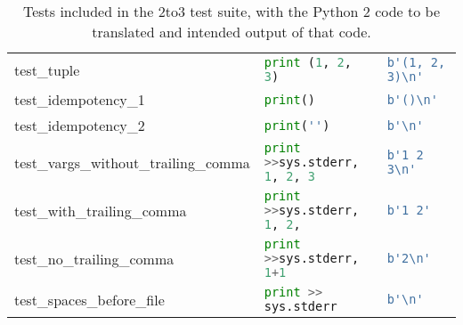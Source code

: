 \begin{table}[]
\begin{tabular}{@{}l|ll@{}}
    test\_tuple                           & \lstinline[language=Python, style=pythonstyle]|print (1, 2, 3)                                      | & \lstinline[language=Python, style=pythonstyle]|b'(1, 2, 3)\n'         | \\
    test\_idempotency\_1                  & \lstinline[language=Python, style=pythonstyle]|print()                                              | & \lstinline[language=Python, style=pythonstyle]|b'()\n'                | \\
    test\_idempotency\_2                  & \lstinline[language=Python, style=pythonstyle]|print('')                                            | & \lstinline[language=Python, style=pythonstyle]|b'\n'                  | \\
    test\_vargs\_without\_trailing\_comma & \lstinline[language=Python, style=pythonstyle]|print >>sys.stderr, 1, 2, 3| & \lstinline[language=Python, style=pythonstyle]|b'1 2 3\n'             | \\
    test\_with\_trailing\_comma           & \lstinline[language=Python, style=pythonstyle]|print >>sys.stderr, 1, 2,  | & \lstinline[language=Python, style=pythonstyle]|b'1 2'                                | \\
    test\_no\_trailing\_comma             & \lstinline[language=Python, style=pythonstyle]|print >>sys.stderr, 1+1    | & \lstinline[language=Python, style=pythonstyle]|b'2\n'                 | \\
    test\_spaces\_before\_file            & \lstinline[language=Python, style=pythonstyle]|print >> sys.stderr          | & \lstinline[language=Python, style=pythonstyle]|b'\n'                  | \\ \bottomrule
    \end{tabular}
    \caption{Tests included in the 2to3 test suite, with the Python 2 code to be translated and intended output of that code.}
    \label{tab:tests}
\end{table}